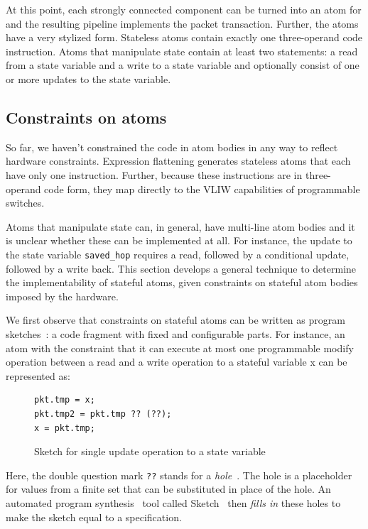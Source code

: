 At this point, each strongly connected component can be turned into an atom for
\absmachine and the resulting pipeline implements the packet transaction.
Further, the atoms have a very stylized form. Stateless atoms contain exactly
one three-operand code instruction. Atoms that manipulate state contain at
least two statements: a read from a state variable and a write to a state
variable and optionally consist of one or more updates to the state variable.

\subsection{Constraints on atoms}
\label{ss:complexity}
So far, we haven't constrained the code in atom bodies in any way to reflect
hardware constraints. Expression flattening generates stateless atoms that each
have only one instruction. Further, because these instructions are in
three-operand code form, they map directly to the VLIW capabilities of
programmable switches.

Atoms that manipulate state can, in general, have multi-line atom bodies and it
is unclear whether these can be implemented at all. For instance, the update to
the state variable \texttt{saved\_hop} requires a read, followed by a
conditional update, followed by a write back. This section develops a general
technique to determine the implementability of stateful atoms, given
constraints on stateful atom bodies imposed by the hardware.

We first observe that constraints on stateful atoms can be written as program
sketches~\cite{bitstreaming, finite, sketch_manual}: a code fragment with fixed
and configurable parts. For instance, an atom with the constraint that it can
execute at most one programmable modify operation between a read and a write
operation to a stateful variable x can be represented as:
\begin{figure}
\begin{tiny}
\begin{lstlisting}
pkt.tmp = x;
pkt.tmp2 = pkt.tmp ?? (??);
x = pkt.tmp;
\end{lstlisting}
\end{tiny}
\caption{Sketch for single update operation to a state variable}
\label{fig:sketch_for_state}
\end{figure}
Here, the double question mark \texttt{??} stands for a
\textit{hole}~\cite{sketch_manual}. The hole is a placeholder for values from a
finite set that can be substituted in place of the hole. An automated program
synthesis~\cite{synthesis} tool called Sketch~\cite{sketch_manual} then
\textit{fills in} these holes to make the sketch equal to a specification.

